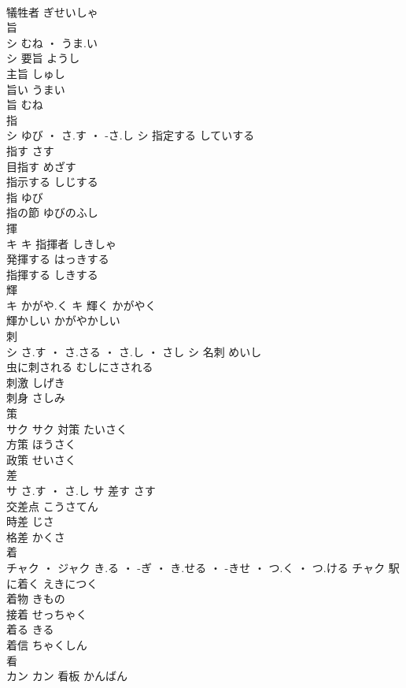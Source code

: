 \documentclass[8pt]{extreport}
\begin{document}
\begin{CJK}{UTF8}{min}
\\	犠牲者	ぎせいしゃ	
\\	旨	
\\	シ	むね ・ うま.い
\\	シ	要旨	ようし	
\\	主旨	しゅし	
\\	旨い	うまい	
\\	旨	むね	
\\	指	
\\	シ	ゆび ・ さ.す ・ -さ.し	シ	指定する	していする	
\\	指す	さす	
\\	目指す	めざす	
\\	指示する	しじする	
\\	指	ゆび	
\\	指の節	ゆびのふし	
\\	揮	
\\	キ		キ	指揮者	しきしゃ	
\\	発揮する	はっきする	
\\	指揮する	しきする	
\\	輝	
\\	キ	かがや.く	キ	輝く	かがやく	
\\	輝かしい	かがやかしい	
\\	刺	
\\	シ	さ.す ・ さ.さる ・ さ.し ・ さし	シ	名刺	めいし	
\\	虫に刺される	むしにさされる	
\\	刺激	しげき	
\\	刺身	さしみ	
\\	策	
\\	サク		サク	対策	たいさく	
\\	方策	ほうさく	
\\	政策	せいさく	
\\	差	
\\	サ	さ.す ・ さ.し	サ	差す	さす	
\\	交差点	こうさてん	
\\	時差	じさ	
\\	格差	かくさ	
\\	着	
\\	チャク ・ ジャク	き.る ・ -ぎ ・ き.せる ・ -きせ ・ つ.く ・ つ.ける	チャク	駅に着く	えきにつく	
\\	着物	きもの	
\\	接着	せっちゃく	
\\	着る	きる	
\\	着信	ちゃくしん	
\\	看	
\\	カン		カン	看板	かんばん	

\end{CJK}
\end{document}
